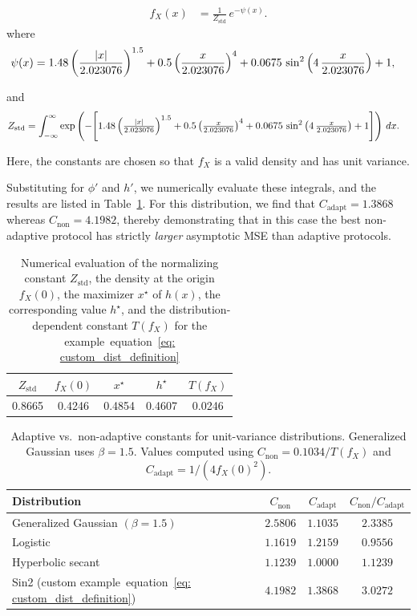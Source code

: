 \documentclass[10pt]{article} %
\def\eqref#1{equation~\ref{#1}}
\theoremstyle{plain}
\theoremstyle{definition}
\theoremstyle{remark}
\begin{document}
  
\begin{align}
f_X(x)
&= \frac{1}{Z_{\text{std}}}\,e^{-\psi(x)}.
\label{eq: custom_dist_definition}
\end{align}
where
\begin{align}
\psi(x)
&= 1.48\left(\frac{|x|}{2.023076}\right)^{1.5}
+ 0.5\left(\frac{x}{2.023076}\right)^4
 + 0.0675\,\sin^2 \left(4\,\frac{x}{2.023076}\right)
 + 1, \notag
\end{align}

and
\begin{align}
Z_{\text{std}}
&= \int_{-\infty}^{\infty} \exp \left( -\Bigg[ 1.48 \left(\tfrac{|x|}{2.023076}\right)^{1.5} + 0.5 \left(\tfrac{x}{2.023076}\right)^4 + 0.0675\,\sin^2 \left(4\,\tfrac{x}{2.023076}\right) + 1  \Bigg] \right)\,dx. \notag
\end{align}

Here, the constants are chosen so that $f_X$ is a valid density and has unit variance.


Substituting for $\phi'$ and $h'$, we numerically evaluate these integrals, and the results are listed in Table~\ref{tab:computed_values_strict}. 
For this distribution, we find that $C_{\text{adapt}}=1.3868$ whereas $C_{\text{non}}=4.1982$, thereby demonstrating that in this case the best non-adaptive protocol has strictly \emph{larger} asymptotic MSE than adaptive protocols.
\begin{table}
\centering
\begin{tabular}{|c|c|c|c|c|}
\hline
$Z_{\text{std}}$ & $f_X(0)$ & $x^\star$ & $h^\star$ & $T(f_X)$ \\
\hline
0.8665 & 0.4246 & 0.4854 & 0.4607 & 0.0246 \\
\hline
\end{tabular}
\caption{Numerical evaluation of the normalizing constant $Z_{\text{std}}$, the density at the origin $f_X(0)$, the maximizer $x^\star$ of $h(x)$, the corresponding value $h^\star$, and the distribution-dependent constant $T(f_X)$ for the example~\eqref{eq: custom_dist_definition}}
\label{tab:computed_values_strict}
\end{table}

\begin{table}
\centering
\begin{tabular}{|l|c|c|c|}
\hline
\textbf{Distribution} & $C_{\mathrm{non}}$ & $C_{\mathrm{adapt}}$ & $C_{\mathrm{non}}/C_{\mathrm{adapt}}$ \\
\hline
Generalized Gaussian $(\beta=1.5)$ & $2.5806$ & $1.1035$ & $2.3385$ \\
\hline
Logistic & $1.1619$ & $1.2159$ & $0.9556$ \\
\hline
Hyperbolic secant & $1.1239$ & $1.0000$ & $1.1239$ \\
\hline
Sin2 (custom example~\eqref{eq: custom_dist_definition}) & $4.1982$ & $1.3868$ & $3.0272$ \\
\hline
\end{tabular}
\caption{Adaptive vs.\ non-adaptive constants for unit-variance distributions.
Generalized Gaussian uses $\beta = 1.5$. Values computed using $C_{\mathrm{non}} = 0.1034/T(f_X)$ and $C_{\mathrm{adapt}} = 1/(4f_X(0)^2)$.}
\label{tab:const_gap}
\end{table}
\end{document}
